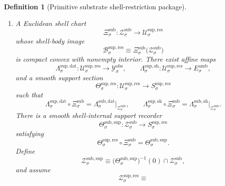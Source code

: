 \documentclass[11pt]{article}
\newcommand{\DataSpace}[1]{\mathcal Y_{#1}^{\mathrm{obs}}}
\newcommand{\AmbientTarget}[1]{E_{#1}^{\mathrm{amb}}}
\newcommand{\EqnTarget}[1]{Q_{#1}^{\mathrm{eqn}}}
\newcommand{\EqnPair}[1]{\mathfrak b_{#1}^{\mathrm{eqn}}}
\newcommand{\ResSpace}[1]{\mathcal U_{#1}^{\mathrm{sup,res}}}
\newcommand{\ResBody}[1]{\mathcal B_{#1}^{\mathrm{sup,res}}}
\newcommand{\ResTarget}[1]{S_{#1}^{\mathrm{sup,res}}}
\newcommand{\ResPair}[1]{\mathfrak m_{#1}^{\mathrm{sup,res}}}
\newcommand{\ResSection}[1]{\Theta_{#1}^{\mathrm{sup,res}}}
\newcommand{\ResData}[1]{\Lambda_{#1}^{\mathrm{sup,dat}}}
\newcommand{\ResShellMap}[1]{\Lambda_{#1}^{\mathrm{sup,sh}}}
\newcommand{\ResShellSet}[1]{\mathcal Z_{#1}^{\mathrm{sup,res}}}
\newcommand{\SubSpace}[1]{\mathcal M_{#1}^{\mathrm{sub}}}
\newcommand{\SubBody}[1]{\mathcal B_{#1}^{\mathrm{sub}}}
\newcommand{\SubSection}[1]{\Sigma_{#1}^{\mathrm{sub}}}
\newcommand{\SubShellSet}[1]{\mathcal Z_{#1}^{\mathrm{sub}}}
\newcommand{\SubData}[1]{\Lambda_{#1}^{\mathrm{sub,dat}}}
\newcommand{\SubShellMap}[1]{\Lambda_{#1}^{\mathrm{sub,sh}}}
\newcommand{\SubSym}[1]{\mathbb G_{#1}^{\mathrm{sub}}}
\newcommand{\SubTime}[1]{\vartheta_{#1}^{\mathrm{sub}}}
\newcommand{\SubChart}[1]{\Xi_{#1}^{\mathrm{sub}}}
\newcommand{\SubSupport}[1]{\Theta_{#1}^{\mathrm{sub,sup}}}
\newcommand{\SubSupportShell}[1]{\mathcal Z_{#1}^{\mathrm{sub,sup}}}
\newtheorem{definition}{Definition}
\begin{document}
\begin{definition}[Primitive substrate shell-restriction package]
\begin{enumerate}
\[    \]
    a positive-definite symmetric support pairing
    \[
    \ResPair{\sigma}:
    \ResTarget{\sigma}\times\ResTarget{\sigma}\to\mathbb R,
    \]
    a finite-dimensional real hidden target
    \[
    \EqnTarget{\sigma},
    \]
    and a positive-definite symmetric hidden pairing
    \[
    \EqnPair{\sigma}:
    \EqnTarget{\sigma}\times\EqnTarget{\sigma}\to\mathbb R.
    \]
    There is also a compact symmetry group
    \[
    \SubSym{\sigma}
    \]
    and an involution
    \[
    \SubTime{\sigma},
    \]
    acting orthogonally on \(\SubSpace{\sigma}\), \(\DataSpace{\sigma}\), \(\AmbientTarget{\sigma}\), and \(\ResTarget{\sigma}\), and by \(\EqnPair{\sigma}\)-isometries on \(\EqnTarget{\sigma}\), preserving \(\SubBody{\sigma}\), \(\SubShellSet{\sigma}\), \(\SubSection{\sigma}\), \(\SubData{\sigma}\), and \(\SubShellMap{\sigma}\).
    \item A Euclidean shell chart
    \[
    \SubChart{\sigma}:\SubShellSet{\sigma}\to\ResSpace{\sigma}
    \]
    whose shell-body image
    \[
    \ResBody{\sigma}
    \equiv
    \SubChart{\sigma}\bigl(\SubShellSet{\sigma}\bigr)
    \]
    is compact convex with nonempty interior. There exist affine maps
    \[
    \ResData{\sigma}:\ResSpace{\sigma}\to\DataSpace{\sigma},
    \qquad
    \ResShellMap{\sigma}:\ResSpace{\sigma}\to\AmbientTarget{\sigma},
    \]
    and a smooth support section
    \[
    \ResSection{\sigma}:\ResSpace{\sigma}\to\ResTarget{\sigma}
    \]
    such that
    \begin{equation}
    \ResData{\sigma}\circ\SubChart{\sigma}
    =
    \SubData{\sigma}\big|_{\SubShellSet{\sigma}},
    \qquad
    \ResShellMap{\sigma}\circ\SubChart{\sigma}
    =
    \SubShellMap{\sigma}\big|_{\SubShellSet{\sigma}}.
    \label{eq:subchartreadouts}
    \end{equation}
    There is a smooth shell-internal support recorder
    \[
    \SubSupport{\sigma}:\SubShellSet{\sigma}\to\ResTarget{\sigma}
    \]
    satisfying
    \begin{equation}
    \ResSection{\sigma}\circ\SubChart{\sigma}
    =
    \SubSupport{\sigma}.
    \label{eq:supporttransport}
    \end{equation}
    Define
    \begin{equation}
    \SubSupportShell{\sigma}
    \equiv
    \bigl(\SubSupport{\sigma}\bigr)^{-1}(0)\cap\SubShellSet{\sigma},
    \label{eq:subsupportshell}
    \end{equation}
    and assume
    \begin{equation}
    \ResShellSet{\sigma}
    \equiv

\end{equation}
\end{enumerate}
\end{definition}
\end{document}
